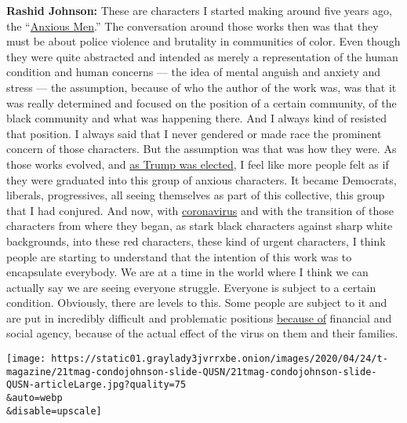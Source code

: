 \textbf{Rashid Johnson:} These are characters I started making around
five years ago, the
``\href{https://www.nytimes3xbfgragh.onion/interactive/2015/11/01/arts/design/01rashid-johnson-anxious-men.html}{Anxious
Men}.'' The conversation around those works then was that they must be
about police violence and brutality in communities of color. Even though
they were quite abstracted and intended as merely a representation of
the human condition and human concerns --- the idea of mental anguish
and anxiety and stress --- the assumption, because of who the author of
the work was, was that it was really determined and focused on the
position of a certain community, of the black community and what was
happening there. And I always kind of resisted that position. I always
said that I never gendered or made race the prominent concern of those
characters. But the assumption was that was how they were. As those
works evolved, and
\href{https://www.nytimes3xbfgragh.onion/interactive/2018/upshot/election-2016-voting-precinct-maps.html}{as
Trump was elected}, I feel like more people felt as if they were
graduated into this group of anxious characters. It became Democrats,
liberals, progressives, all seeing themselves as part of this
collective, this group that I had conjured. And now, with
\href{https://www.nytimes3xbfgragh.onion/news-event/coronavirus}{coronavirus}
and with the transition of those characters from where they began, as
stark black characters against sharp white backgrounds, into these red
characters, these kind of urgent characters, I think people are starting
to understand that the intention of this work was to encapsulate
everybody. We are at a time in the world where I think we can actually
say we are seeing everyone struggle. Everyone is subject to a certain
condition. Obviously, there are levels to this. Some people are subject
to it and are put in incredibly difficult and problematic positions
\href{https://www.nytimes3xbfgragh.onion/2020/03/15/world/europe/coronavirus-inequality.html}{because
of} financial and social agency, because of the actual effect of the
virus on them and their families.

\texttt{[image: https://static01.graylady3jvrrxbe.onion/images/2020/04/24/t-magazine/21tmag-condojohnson-slide-QUSN/21tmag-condojohnson-slide-QUSN-articleLarge.jpg?quality=75\\\&auto=webp\\\&disable=upscale]}

